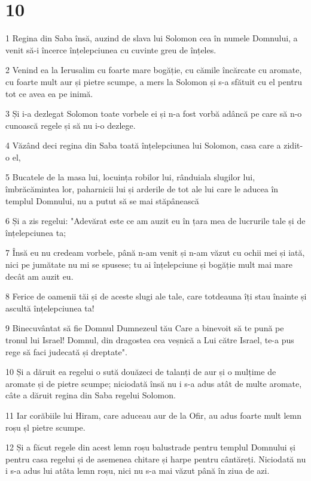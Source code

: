 \chapter{10}

\par 1 Regina din Saba însă, auzind de slava lui Solomon cea în numele Domnului, a venit să-i încerce înțelepciunea cu cuvinte greu de înțeles.
\par 2 Venind ea la Ierusalim cu foarte mare bogăție, cu cămile încărcate cu aromate, cu foarte mult aur și pietre scumpe, a mers la Solomon și s-a sfătuit cu el pentru tot ce avea ea pe inimă.
\par 3 Și i-a dezlegat Solomon toate vorbele ei și n-a fost vorbă adâncă pe care să n-o cunoască regele și să nu i-o dezlege.
\par 4 Văzând deci regina din Saba toată înțelepciunea lui Solomon, casa care a zidit-o el,
\par 5 Bucatele de la masa lui, locuința robilor lui, rânduiala slugilor lui, îmbrăcămintea lor, paharnicii lui și arderile de tot ale lui care le aducea în templul Domnului, nu a putut să se mai stăpânească
\par 6 Și a zis regelui: "Adevărat este ce am auzit eu în țara mea de lucrurile tale și de înțelepciunea ta;
\par 7 Însă eu nu credeam vorbele, până n-am venit și n-am văzut cu ochii mei și iată, nici pe jumătate nu mi se spusese; tu ai înțelepciune și bogăție mult mai mare decât am auzit eu.
\par 8 Ferice de oamenii tăi și de aceste slugi ale tale, care totdeauna îți stau înainte și ascultă înțelepciunea ta!
\par 9 Binecuvântat să fie Domnul Dumnezeul tău Care a binevoit să te pună pe tronul lui Israel! Domnul, din dragostea cea veșnică a Lui către Israel, te-a pus rege să faci judecată și dreptate".
\par 10 Și a dăruit ea regelui o sută douăzeci de talanți de aur și o mulțime de aromate și de pietre scumpe; niciodată însă nu i s-a adus atât de multe aromate, câte a dăruit regina din Saba regelui Solomon.
\par 11 Iar corăbiile lui Hiram, care aduceau aur de la Ofir, au adus foarte mult lemn roșu șl pietre scumpe.
\par 12 Și a făcut regele din acest lemn roșu balustrade pentru templul Domnului și pentru casa regelui și de asemenea chitare și harpe pentru cântăreți. Niciodată nu i s-a adus lui atâta lemn roșu, nici nu s-a mai văzut până în ziua de azi.
